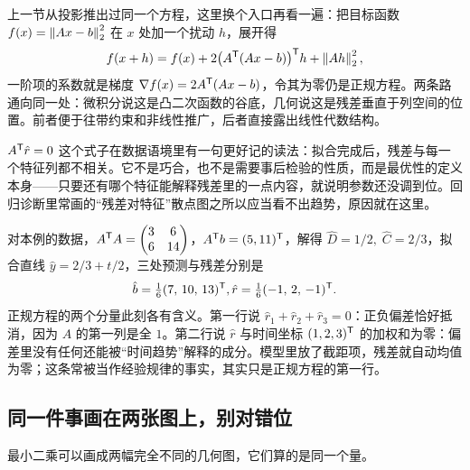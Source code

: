 上一节从投影推出过同一个方程，这里换个入口再看一遍：把目标函数 \(f(x)=\left\lVert Ax-b\right\rVert_2^2\) 在 \(x\) 处加一个扰动 \(h\)，展开得
\[
f(x+h)=f(x)+2\bigl(A^{\mathsf{T}}(Ax-b)\bigr)^{\mathsf{T}}h+\left\lVert Ah\right\rVert_2^2 ,
\]
一阶项的系数就是梯度 \(\nabla f(x)=2A^{\mathsf{T}}(Ax-b)\)，令其为零仍是正规方程。两条路通向同一处：微积分说这是凸二次函数的谷底，几何说这是残差垂直于列空间的位置。前者便于往带约束和非线性推广，后者直接露出线性代数结构。

\(A^{\mathsf{T}}\hat r=0\) 这个式子在数据语境里有一句更好记的读法：拟合完成后，残差与每一个特征列都不相关。它不是巧合，也不是需要事后检验的性质，而是最优性的定义本身——只要还有哪个特征能解释残差里的一点内容，就说明参数还没调到位。回归诊断里常画的``残差对特征''散点图之所以应当看不出趋势，原因就在这里。

对本例的数据，\(A^{\mathsf{T}}A=\begin{pmatrix}3&6\\6&14\end{pmatrix}\)，\(A^{\mathsf{T}}b=(5,11)^{\mathsf{T}}\)，解得 \(\hat D=1/2,\;\hat C=2/3\)，拟合直线 \(\hat y=2/3+t/2\)，三处预测与残差分别是
\[
\hat b=\tfrac16(7,\,10,\,13)^{\mathsf{T}},
\space
\hat r=\tfrac16(-1,\,2,\,-1)^{\mathsf{T}}.
\]
正规方程的两个分量此刻各有含义。第一行说 \(\hat r_1+\hat r_2+\hat r_3=0\)：正负偏差恰好抵消，因为 \(A\) 的第一列是全 \(1\)。第二行说 \(\hat r\) 与时间坐标 \((1,2,3)^{\mathsf{T}}\) 的加权和为零：偏差里没有任何还能被``时间趋势''解释的成分。模型里放了截距项，残差就自动均值为零；这条常被当作经验规律的事实，其实只是正规方程的第一行。

\subsection{同一件事画在两张图上，别对错位}

最小二乘可以画成两幅完全不同的几何图，它们算的是同一个量。

